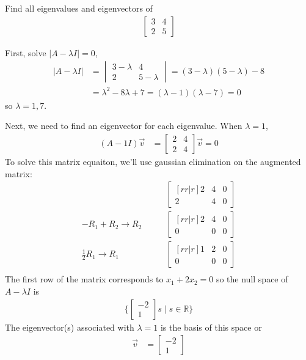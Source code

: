 \begin{example} \label{ex:eigs:real1}
Find all eigenvalues and eigenvectors of 
% 
\begin{align*}
\begin{bmatrix}
 3 & 4 \\
 2 & 5 
\end{bmatrix}
\end{align*}

\solution

First, solve $|A-\lambda I| = 0$, 
% 
\begin{align*}
 |A - \lambda I| & = 
\begin{vmatrix}
 3-\lambda & 4 \\
 2 & 5 - \lambda 
\end{vmatrix} = 
(3-\lambda)(5-\lambda) - 8 \\
& = \lambda^2 -8\lambda +7 = (\lambda-1)(\lambda-7) =0
\end{align*}
so $\lambda = 1,7$.  

Next, we need to find an eigenvector for each eigenvalue.  When $\lambda=1$, 
% 
\begin{align*}
 (A-1 I)\vec{v} & = 
\begin{bmatrix}
 2 & 4 \\
 2 & 4 
\end{bmatrix} \vec{v}  = 0 
\end{align*}
To solve this matrix equaiton, we'll use gaussian elimination on the augmented matrix:
% 
\begin{align*}
& \qquad \begin{bmatrix}[rr|r]
2 &4  & 0 \\
2 & 4 & 0  
\end{bmatrix} \\
-R_1 + R_2 \rightarrow R_2 & \qquad
\begin{bmatrix}[rr|r]
2 &4  & 0 \\
0 & 0 & 0  
\end{bmatrix} \\
\frac{1}{2} R_1 \rightarrow R_1 & \qquad 
\begin{bmatrix}[rr|r]
1 & 2  & 0 \\
0 & 0 & 0  
\end{bmatrix} \\
\end{align*}
The first row of the matrix corresponds to $x_1+2x_2=0$ so the null space of $A-\lambda I$ is 
% 
\begin{align*}
\{
\begin{bmatrix}
 -2 \\ 1 
\end{bmatrix} s  \; | \; s \in \mathbb{R} \}
\end{align*}
The eigenvector(s) associated with $\lambda=1$ is the basis of this space or 
% 
\begin{align*}
 \vec{v} & = 
\begin{bmatrix}
 -2 \\ 1 
\end{bmatrix}
\end{align*}



\end{example}
